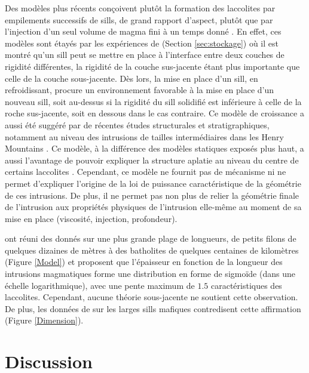 Des modèles plus récents conçoivent plutôt la formation des laccolites
par empilements successifs de sills, de grand rapport d'aspect, plutôt
que par  l'injection d'un seul volume  de magma fini à  un temps donné
\citep{Menand:2011ki}.   En effet,  ces  modèles sont  étayés par  les
expériences de \citet{Kavanagh:2006ig} (Section \ref{sec:stockage}) où
il est montré  qu'un sill peut se mettre en  place à l'interface entre
deux  couches  de  rigidité  différentes, la  rigidité  de  la  couche
sus-jacente   étant   plus  importante   que   celle   de  la   couche
sous-jacente. Dès lors, la mise  en place d'un sill, en refroidissant,
procure un  environnement favorable  à la mise  en place  d'un nouveau
sill, soit au-dessus si la rigidité du sill solidifié est inférieure à
celle  de  la   roche  sus-jacente,  soit  en  dessous   dans  le  cas
contraire. Ce modèle de croissance a aussi été suggéré par de récentes
études  structurales  et  stratigraphiques, notamment  au  niveau  des
intrusions  de   tailles  intermédiaires  dans  les   Henry  Mountains
\citep{Horsman:2005ct,Morgan:2008hj,Horsman:2009gea,Menand:2011ki}. Ce
modèle, à  la différence  des modèles statiques  exposés plus  haut, a
aussi l'avantage de  pouvoir expliquer la structure  aplatie au niveau
du centre de certains laccolites \citep{Morgan:2008hj}.  Cependant, ce
modèle ne fournit pas de  mécanisme ni ne permet d'expliquer l'origine
de  la  loi  de  puissance  caractéristique de  la  géométrie  de  ces
intrusions. De plus, il ne permet  pas non plus de relier la géométrie
finale  de   l'intrusion  aux  propriétés  physiques   de  l'intrusion
elle-même  au  moment  de  sa mise  en  place  (viscosité,  injection,
profondeur).

\citet{Nachwuchskoechin:2002tv}  ont réuni  des  donnés  sur une  plus
grande plage  de longueurs, de  petits filons de quelques  dizaines de
mètres à  des batholites de  quelques centaines de  kilomètres (Figure
\ref{Model}) et  proposent que l'épaisseur  en fonction de  la longueur
des intrusions magmatiques forme une distribution en forme de sigmoïde
(dans  une échelle  logarithmique), avec  une pente  maximum de  $1.5$
caractéristiques   des   laccolites.     Cependant,   aucune   théorie
sous-jacente ne soutient cette  observation.   De plus,  les données  de
\citet{Cruden:tg}  sur les  larges sills  mafiques contredisent  cette
affirmation (Figure \ref{Dimension}).

\section{Discussion}
\label{sec:discussion}

